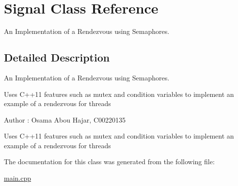 \hypertarget{class_signal}{}\section{Signal Class Reference}
\label{class_signal}


An Implementation of a Rendezvous using Semaphores.  




\subsection{Detailed Description}
An Implementation of a Rendezvous using Semaphores. 

Uses C++11 features such as mutex and condition variables to implement an example of a rendezvous for threads \begin{DoxyAuthor}{Author}
\+: Osama Abou Hajar, C00220135
\end{DoxyAuthor}
Uses C++11 features such as mutex and condition variables to implement an example of a rendezvous for threads 

The documentation for this class was generated from the following file\+:\begin{DoxyCompactItemize}
\item 
\hyperlink{main_8cpp}{main.\+cpp}\end{DoxyCompactItemize}
